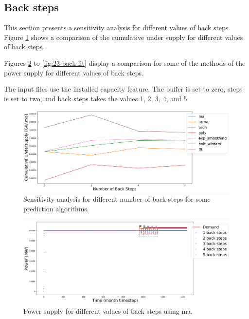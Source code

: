 \documentclass[11pt]{article}
\begin{document}
\subsection{Back steps}

This section presents a sensitivity analysis for different values of  back steps. Figure \ref{fig:23-backs} shows a comparison of the cumulative under supply for different values of back steps.

Figures \ref{fig:23-back-ma} to \ref{fig:23-back-fft} display a comparison for some of the methods of the power supply for different values of back steps.

The input files use the installed capacity feature. The buffer is set to zero, steps is set to two, and back steps takes the values 1, 2, 3, 4, and 5.

\begin{figure}[H]
	\centering
	\includegraphics[width=\textwidth]{23-figures/23-sens-backs.png} 
	\hfill
	\caption{Sensitivity analysis for different number of back steps for some prediction algorithms.}
	\label{fig:23-backs}
\end{figure}

\begin{figure}[H]
	\centering
	\includegraphics[width=\textwidth]{23-figures/23-power-buffer0-ma-back.png} 
	\hfill
	\caption{Power supply for different values of back steps using ma.}
	\label{fig:23-back-ma}
\end{figure}
\end{document}
